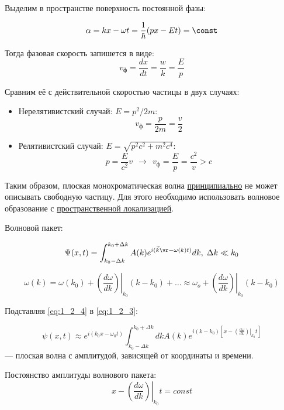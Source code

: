 Выделим в пространстве поверхность постоянной фазы:

$$\alpha = k x - \omega t = \frac{1}{\hbar} (px - Et) = \const$$

Тогда фазовая скорость запишется в виде:
\begin{equation}
\label{eq:1_2_2}
v_{\text{ф}} = \frac{dx}{dt} = \frac{w}{k} = \frac{E}{p}
\end{equation}

Сравним её с действительной скоростью частицы в двух случаях:

\begin{itemize}
\item Нерелятивистский случай: $E = p^2/{2m}$:  $$v_{\text{ф}} = \frac{p}{2m} = \frac{v}{2}$$
\item  Релятивистский случай: $E = \sqrt{p^2c^2 + m^2c^4}$: $$p = \frac{E}{c^2}v~~\rightarrow~~v_{\text{ф}} = \frac{E}{p} = \frac{c^2}{v} > c$$
\end{itemize}

Таким образом, плоская монохроматическая волна \underline{принципиально} не может описывать свободную частицу. Для этого необходимо использовать волновое образование с \underline{пространственной локализацией}.

Волновой пакет:

\begin{equation}
\label{eq:1_2_3}
\Psi(x,t) = \int^{k_0 + \Delta k}_{k_0 - \Delta k} A(k)e^{i(\vec{k}\vr - \omega (k) t)} dk, \; \Delta k\ll k_0
\end{equation}

\begin{equation}
\label{eq:1_2_4}
\omega (k) = \omega (k_0) + \left. \left ( \frac{d \omega}{dk} \right ) \right |_{k_0} (k-k_0) + \ldots \approx \omega_o +  \left. \left ( \frac{d \omega}{dk} \right ) \right |_{k_0} (k-k_0)
\end{equation}

Подставляя \eqref{eq:1_2_4} в \eqref{eq:1_2_3}:

\begin{equation}
\label{eq:1_2_5}
\psi(x,t) \approx e^{i(k_0 x - \omega_0 t) }\int^{k_0 + \Delta k}_{k_0 - \Delta k} dk A(k)e^{i(k - k_0) \left [ x - \left . \left ( \frac{d\omega}{dk} \right ) \right |_{k_0} t \right ]}
\end{equation}
--- плоская волна с амплитудой, зависящей от координаты и времени.

Постоянство амплитуды волнового пакета:
\begin{equation}
\label{eq:1_2_6}
x - \left . \left ( \frac{d\omega}{dk} \right ) \right |_{k_0} t = const
\end{equation}

